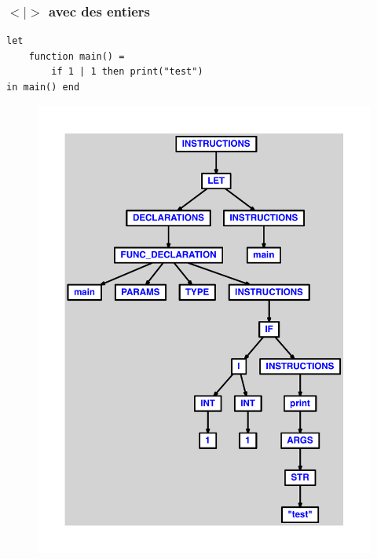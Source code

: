 \documentclass{article}
\begin{document}
\subsubsection{$ < $$ | $$ > $ avec des entiers}
\begin{lstlisting}
let
	function main() =
		if 1 | 1 then print("test")
in main() end
\end{lstlisting}
\newpage
\begin{figure}[H]
\centering
\includegraphics[max width=\textwidth]{ast/ast_286.pdf}
\end{figure}
\newpage
\end{document}
